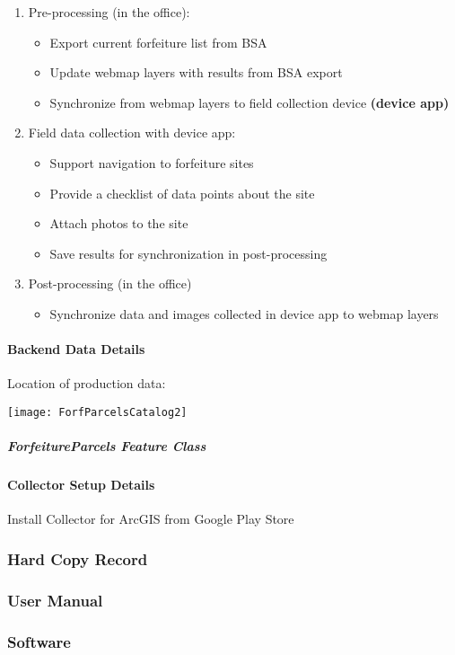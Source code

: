 \documentclass[class=article , crop=false, titlepage, twoside, multi={itemize, figure, verbatim}, float=false]{standalone}
\begin{document}
\begin{enumerate}

\item Pre-processing (in the office):
\begin{itemize}

\item Export current forfeiture list from BSA
\item Update webmap layers with results from BSA export
\item Synchronize from webmap layers to field collection device \textbf{(device app)}
\end{itemize}

\item Field data collection with device app:
\begin{itemize}

\item Support navigation to forfeiture sites
\item Provide a checklist of data points about the site
\item Attach photos to the site
\item Save results for synchronization in post-processing
\end{itemize}

\item Post-processing (in the office)
\begin{itemize}

\item Synchronize data and images collected in device app to webmap layers

\end{itemize}
\end{enumerate}

\paragraph{Backend Data Details\\}
Location of production data:

\begin{center}
    \texttt{[image: ForfParcelsCatalog2]}
    \label{img:g}
\end{center}

\subparagraph{ForfeitureParcels Feature Class\\}
\clearpage
\paragraph{Collector Setup Details\\}
Install Collector for ArcGIS from Google Play Store

\clearpage
\subsubsection{Hard Copy Record}
\clearpage
\subsubsection{User Manual}
\clearpage
\subsubsection{Software}
\clearpage
\end{document}
